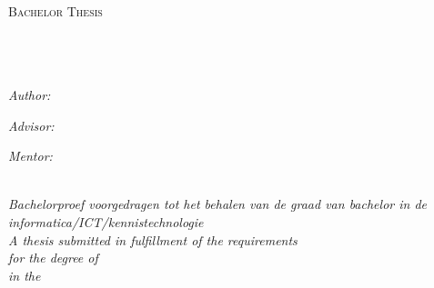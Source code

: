 \documentclass[
11pt, %
oneside, %
english, %
singlespacing, %
headsepline, %
]{MastersDoctoralThesis} %
\author{Axel \textsc{Faes}} %
\begin{document}
\frontmatter %

\pagestyle{plain} %


\begin{titlepage}
\begin{center}

\textsc{\LARGE \univname}\\[1.5cm] %

\textsc{\Large Bachelor Thesis}\\[0.5cm] %

\HRule \\[0.4cm] %
{\huge \bfseries \ttitle}\\[0.4cm] %
\HRule \\[1.5cm] %
 
\begin{minipage}{0.4\textwidth}
\begin{flushleft} \large
\emph{Author:}\\
{\authorname} %
\end{flushleft}
\end{minipage}
\begin{minipage}{0.4\textwidth}
\begin{flushright} \large
\emph{Advisor:} \\
{\adname} %

\emph{Mentor:} \\
{\supname} %
\end{flushright}
\end{minipage}\\[1.5cm]
 
\large \textit{Bachelorproef voorgedragen tot het behalen van de graad van bachelor in de informatica/ICT/kennistechnologie}\\[0.3cm]
\large \textit{A thesis submitted in fulfillment of the requirements\\ for the degree of \degreename}\\[0.3cm] %
\textit{in the}\\[0.4cm]
\groupname\\\deptname\\[1cm] %
 

\end{center}
\end{titlepage}
\end{document}
